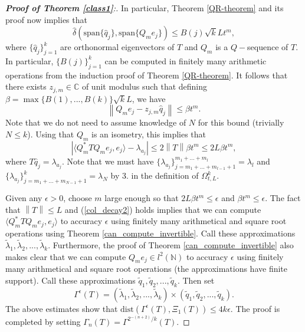 \documentclass[a4paper,10pt]{article}
\begin{document}
\begin{proof}[\textbf{Proof of Theorem \ref{class1}}:]
In particular, Theorem \ref{QR-theorem} and its proof now implies that
$$
\hat\delta(\mathrm{span}\{\hat q_j\},\mathrm{span}\{Q_me_j\})\leq B(j)\sqrt{k}Lt^m,
$$
where $\{\hat q_j\}_{j=1}^k$ are orthonormal eigenvectors of $T$ and $Q_m$ is a $Q-$sequence of $T$. In particular, $\{B(j)\}_{j=1}^k$ can be computed in finitely many arithmetic operations from the induction proof of Theorem \ref{QR-theorem}. %
It follows that there exists $z_{j,m}\in\mathbb{C}$ of unit modulus such that defining $\beta=\max\{B(1),...,B(k)\}\sqrt{k}L$, we have
$$
\left\|Q_me_j-z_{j,m}\hat q_j\right\|\leq \beta t^m.
$$
Note that we do not need to assume knowledge of $N$ for this bound (trivially $N\leq k$). Using that $Q_m$ is an isometry, this implies that
$$
\left|\langle Q_m^*TQ_me_j,e_j\rangle - \lambda_{a_j}\right|\leq 2\left\|T\right\|\beta t^m\leq 2L\beta t^m,
$$
where $T\hat q_j=\lambda_{a_j}$. Note that we must have $\{\lambda_{a_j}\}_{j=m_1+...+m_{l-1}+1}^{m_1+...+m_l}=\lambda_l$ and $\{\lambda_{a_j}\}_{j=m_1+...+m_{N-1}+1}^{k}=\lambda_N$ by 3. in the definition of $\Omega_{t,L}^k$.

Given any $\epsilon>0$, choose $m$ large enough so that $2L\beta t^m\leq \epsilon$ and $\beta t^m\leq\epsilon$. The fact that $\left\|T\right\|\leq L$ and (\ref{col_decay2}) holds implies that we can compute $\langle Q_m^*TQ_me_j,e_j\rangle$ to accuracy $\epsilon$ using finitely many arithmetical and square root operations using Theorem \ref{can_compute_invertible}. Call these approximations $\tilde\lambda_1,\tilde\lambda_2,...,\tilde\lambda_k$. Furthermore, the proof of Theorem \ref{can_compute_invertible} also makes clear that we can compute $Q_me_j\in l^2(\mathbb{N})$ to accuracy $\epsilon$ using finitely many arithmetical and square root operations (the approximations have finite support). Call these approximations $\tilde q_1,\tilde q_2,...,\tilde q_k$. Then set
$$
\Gamma^{\epsilon}(T)=(\tilde\lambda_1,\tilde\lambda_2,...,\tilde\lambda_k)\times(\tilde q_1,\tilde q_2,...,\tilde q_k).
$$
The above estimates show that $\mathrm{dist}(\Gamma^{\epsilon}(T),\Xi_1(T))\leq 4k\epsilon$. The proof is completed by setting $\Gamma_{n}(T)=\Gamma^{2^{-(n+2)}/k}(T)$.
\end{proof}
\end{document}
